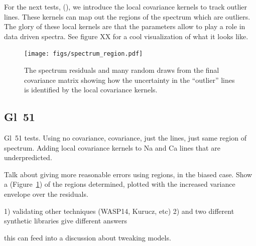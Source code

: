 \documentclass[iop,floatfix]{emulateapj}
\begin{document}
For the next tests, (), we introduce the local covariance kernels to track outlier lines. These kernels can map out the regions of the spectrum which are outliers. The glory of these local kernels are that the parameters allow to play a role in data driven spectra. See figure XX for a cool visualization of what it looks like.

\begin{figure}[!htb]
\begin{center}
  \texttt{[image: figs/spectrum\_region.pdf]}
  \caption{The spectrum residuals and many random draws from the final covariance matrix showing how the uncertainty in the ``outlier'' lines is identified by the local covariance kernels.}
\label{fig:regions}
\end{center}
\end{figure}

\subsection{Gl~51}
Gl~51 tests. Using no covariance, covariance, just the lines, just same region of spectrum. Adding local covariance kernels to Na and Ca lines that are underpredicted.

Talk about giving more reasonable errors using regions, in the biased case.
Show a (Figure~\ref{fig:regions}) of the regions determined, plotted with the increased variance envelope over the residuals.

1) validating other techniques (WASP14, Kurucz, etc)
2) and two different synthetic libraries give different answers

this can feed into a discussion about tweaking models.
\end{document}
